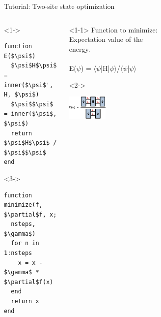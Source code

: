\begin{frame}[fragile]{Tutorial: Two-site state optimization}

\begin{columns}

\begin{column}{5cm}

\begin{onlyenv}<1->
\begin{lstlisting}[language=JuliaLocal, style=julia, mathescape, basicstyle=\small]
function E($\psi$)
  $\psi$H$\psi$ = inner($\psi$', H, $\psi$)
  $\psi$$\psi$ = inner($\psi$, $\psi$)
  return $\psi$H$\psi$ / $\psi$$\psi$
end
\end{lstlisting}
\end{onlyenv}

\begin{onlyenv}<3->
\begin{lstlisting}[language=JuliaLocal, style=julia, mathescape, basicstyle=\small]
function minimize(f, $\partial$f, x;
  nsteps, $\gamma$)
  for n in 1:nsteps
    x = x - $\gamma$ * $\partial$f(x)
  end
  return x
end
\end{lstlisting}
\end{onlyenv}

\end{column}

\begin{column}{5cm}

\begin{onlyenv}<1-1>
Function to minimize: \\
Expectation value of the \\
energy. \\
~\\
E($\psi$) = $\langle$$\psi$|H|$\psi$$\rangle$/$\langle$$\psi$|$\psi$$\rangle$
\end{onlyenv}

\begin{onlyenv}<2->
\vspace*{0.0cm}
\begin{center}
\includegraphics[width=0.2\textwidth]{
  slides/assets/psi12Hpsi12.png
}
\end{center}
\vspace*{0.0cm}
\end{onlyenv}


\end{column}
\end{columns}
\end{frame}
